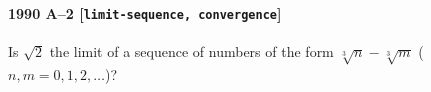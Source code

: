 \paragraph{1990 A--2 \textnormal{[\texttt{limit-sequence, convergence}]}}
Is $\sqrt{2}$ the limit of a sequence of numbers of the form
$\sqrt[3]{n} - \sqrt[3]{m}$ ($n,m = 0, 1, 2, \dots$)?
